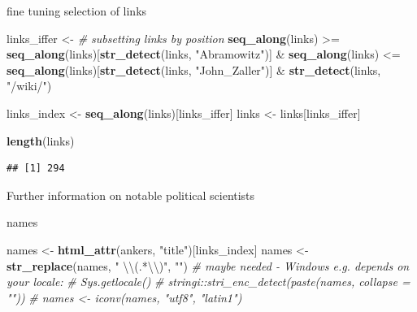 \documentclass[ignorenonframetext,]{beamer}
\newenvironment{Shaded}{\begin{snugshade}}{\end{snugshade}}
\newcommand{\KeywordTok}[1]{\textcolor[rgb]{0.13,0.29,0.53}{\textbf{{#1}}}}
\newcommand{\CharTok}[1]{\textcolor[rgb]{0.31,0.60,0.02}{{#1}}}
\newcommand{\StringTok}[1]{\textcolor[rgb]{0.31,0.60,0.02}{{#1}}}
\newcommand{\CommentTok}[1]{\textcolor[rgb]{0.56,0.35,0.01}{\textit{{#1}}}}
\newcommand{\NormalTok}[1]{{#1}}
\begin{document}
\begin{frame}[fragile]{fine tuning selection of links}

\begin{Shaded}
\begin{Highlighting}[]
\NormalTok{links_iffer <-}\StringTok{ }\CommentTok{# subsetting links by position}
\StringTok{  }\KeywordTok{seq_along}\NormalTok{(links) >=}\StringTok{ }
\StringTok{    }\KeywordTok{seq_along}\NormalTok{(links)[}\KeywordTok{str_detect}\NormalTok{(links, }\StringTok{"Abramowitz"}\NormalTok{)]  &}\StringTok{ }
\StringTok{  }\KeywordTok{seq_along}\NormalTok{(links) <=}
\StringTok{    }\KeywordTok{seq_along}\NormalTok{(links)[}\KeywordTok{str_detect}\NormalTok{(links, }\StringTok{"John_Zaller"}\NormalTok{)] &}\StringTok{ }
\StringTok{  }\KeywordTok{str_detect}\NormalTok{(links, }\StringTok{"/wiki/"}\NormalTok{)}

\NormalTok{links_index <-}\StringTok{ }\KeywordTok{seq_along}\NormalTok{(links)[links_iffer]}
\NormalTok{links <-}\StringTok{ }\NormalTok{links[links_iffer]}

\KeywordTok{length}\NormalTok{(links)}
\end{Highlighting}
\end{Shaded}

\begin{verbatim}
## [1] 294
\end{verbatim}

\end{frame}

\begin{frame}{Further information on notable political scientists}

\end{frame}

\begin{frame}[fragile]{names}

\begin{Shaded}
\begin{Highlighting}[]
\NormalTok{names <-}\StringTok{ }\KeywordTok{html_attr}\NormalTok{(ankers, }\StringTok{"title"}\NormalTok{)[links_index]}
\NormalTok{names <-}\StringTok{ }\KeywordTok{str_replace}\NormalTok{(names, }\StringTok{" }\CharTok{\textbackslash{}\textbackslash{}}\StringTok{(.*}\CharTok{\textbackslash{}\textbackslash{}}\StringTok{)"}\NormalTok{, }\StringTok{""}\NormalTok{)}
\CommentTok{# maybe needed - Windows e.g. depends on your locale: }
\CommentTok{# Sys.getlocale()}
\CommentTok{# stringi::stri_enc_detect(paste(names, collapse = ""))}
\CommentTok{# names <- iconv(names, "utf8", "latin1")}
\end{Highlighting}
\end{Shaded}

\end{frame}
\end{document}
